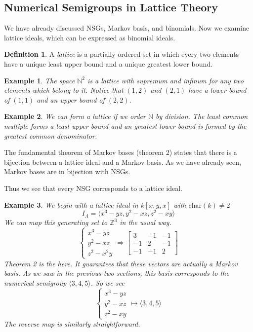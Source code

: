 \documentclass[11pt]{amsart}
\theoremstyle{plain}
\newtheorem{exa}{Example}
\theoremstyle{definition}
\newtheorem{defi}{Definition}
\begin{document}
\subsection{Numerical Semigroups in Lattice Theory}
We have already discussed NSGs, Markov basis, and binomials. Now we examine lattice ideals, which can be expressed as binomial ideals.
\begin{defi}
\cite{stanley}
A \emph{lattice} is a partially ordered set in which every two elements have a
unique least upper bound and a unique greatest lower bound.
\end{defi}
\begin{exa}
The space $\mathbb{N}^2$ is a lattice with supremum and infinum for any two elements which
belong to it. Notice that $(1,2)$ and $(2,1)$ have a lower bound of $(1,1)$ and
an upper bound of $(2,2)$.
\end{exa}
\begin{exa}
We can form a lattice if we order $\mathbb{N}$ by division. The least common
multiple forms a least upper bound and an greatest lower bound is formed by the
greatest common denominator.
\end{exa}
The fundamental theorem of Markov bases (theorem 2)
states that there is a bijection between a lattice ideal and a Markov basis. As
we have already seen, Markov bases are in bijection with NSGs.

Thus we see that every NSG corresponds to a lattice ideal.

\begin{exa}
  We begin with a lattice ideal in $k[x,y,x]$ with $\text{char}(k)\ne 2$
  \[
  I_\Lambda=\langle x^3-yz,y^2-xz,z^2-xy\rangle
  \]
  We can map this generating set to $\mathbb{Z}^3$ in the usual way.
  \[
  \begin{cases}
    x^3-yz\\
    y^2-xz\\
    z^2-x^2y
  \end{cases}
  \Rightarrow
  \left[\begin{array}{rrr}
    3&-1&-1\\
    -1&2&-1\\
    -1&-1&2
  \end{array}\right]
  \]
  Theorem 2 is the here. It guarantees that these vectors are
  actually a Markov basis. As we saw in the previous two sections, this basis
  corresponds to the numerical semigroup $\langle 3,4,5\rangle$. So we see
  \[
  \begin{cases}
    x^3-yz\\
    y^2-xz\\
    z^2-xy
  \end{cases}
  \mapsto\langle 3,4,5\rangle
  \]
  The reverse map is similarly straightforward.
\end{exa}
\end{document}
